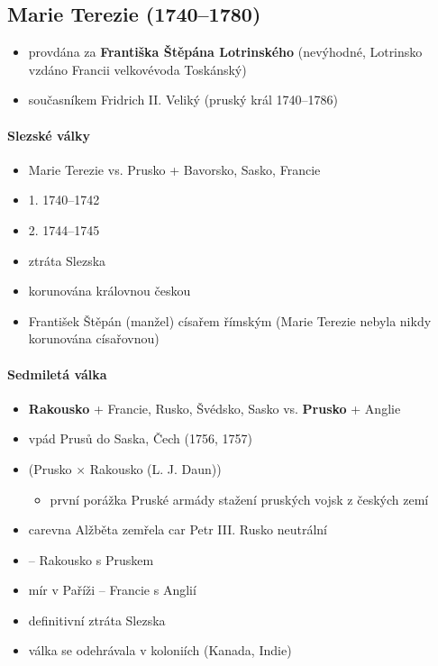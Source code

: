\subsection{Marie Terezie (1740--1780)}
\begin{itemize}
\item provdána za \textbf{Františka Štěpána Lotrinského} (nevýhodné, Lotrinsko vzdáno Francii \ra velkovévoda Toskánský)
\item současníkem Fridrich II. Veliký (pruský král 1740--1786)
\end{itemize}

\paragraph{Slezské války}
\begin{itemize}
\item Marie Terezie vs. Prusko + Bavorsko, Sasko, Francie
\item 1. 1740--1742
\item 2. 1744--1745
\item ztráta Slezska 
\item korunována královnou českou
\item František Štěpán (manžel) císařem římským (Marie Terezie nebyla nikdy korunována císařovnou)
\end{itemize}

\paragraph{Sedmiletá válka}
\begin{itemize}
\item \textbf{Rakousko} + Francie, Rusko, Švédsko, Sasko vs. \textbf{Prusko} + Anglie
\item vpád Prusů do Saska, Čech (1756, 1757)
\item {}  (Prusko $\times$ Rakousko (L. J. Daun))
	\begin{itemize}
	\item první porážka Pruské armády \ra stažení pruských vojsk z českých zemí
	\end{itemize}
\item carevna Alžběta zemřela \ra car Petr III. \ra Rusko neutrální
\item {} -- Rakousko s Pruskem
\item mír v Paříži -- Francie s Anglií
\item definitivní ztráta Slezska
\item válka se odehrávala v koloniích (Kanada, Indie)
\end{itemize}

